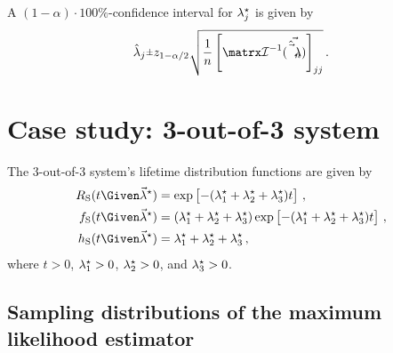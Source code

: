 \documentclass[../main.tex]{subfiles}
\begin{document}
A $(1-\alpha) \cdot 100 \%$-confidence interval for ${\lambda}^{\star}_j$ is 
given by
\begin{equation}
\estimator\lambda_j \raisebox{.2ex}{$\scriptstyle\pm$} z_{1-\alpha/2}
    \sqrt{\frac{1}{n} \left [ \infomatrx^{-1}(\vec{\estimator{\vec\lambda}_n}) \right ]_{j j}}\,.
\end{equation}


\section{Case study: 3-out-of-3 system}
The $3$-out-of-$3$ system's lifetime distribution functions are given by
\begin{align}
    \srv_{\sv}(t \Given \tparam{\vec\lambda}) &=
        \exp
        \left [
            -(\tparam{\lambda}_1 + \tparam{\lambda}_2 + \tparam{\lambda}_3) t
        \right ]\,,\\
    \spdf(t \Given \tparam{\vec\lambda}) &=
        (\tparam{\lambda}_1 + \tparam{\lambda}_2 + \tparam{\lambda}_3)
        \exp
        \left [
            -(\tparam{\lambda}_1 + \tparam{\lambda}_2 + \tparam{\lambda}_3) t
        \right ]\,,\\
    \haz_{\sv}(t \Given \tparam{\vec\lambda}) &= \tparam{\lambda}_1 + \tparam{\lambda}_2 + \tparam{\lambda}_3\,,
\end{align}
where $t > 0$, ${\lambda}^{\star}_1 > 0$, ${\lambda}^{\star}_2 > 0$, and ${\lambda}^{\star}_3 > 0$.

\subsection{Sampling distributions of the maximum likelihood estimator}
\end{document}
